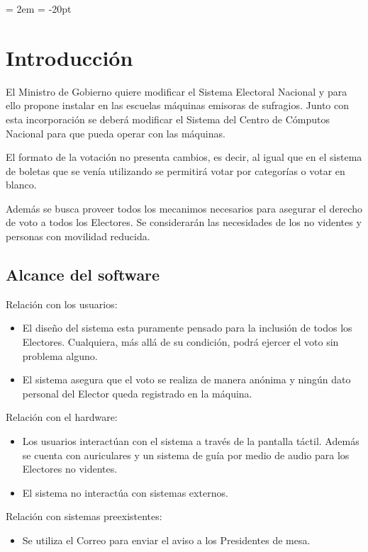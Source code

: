 \documentclass[spanish, 10pt,a4paper]{article}
\numberwithin{equation}{section} %
\begin{document}
{ \oddsidemargin = 2em
	\headheight = -20pt
	\maketitle
}
	\tableofcontents
	\newpage
\section{Introducción}
	El Ministro de Gobierno quiere modificar el Sistema Electoral Nacional y para ello propone instalar en las escuelas máquinas emisoras de sufragios. Junto con esta incorporación se deberá modificar el Sistema del Centro de Cómputos Nacional para que pueda operar con las máquinas.

	El formato de la votación no presenta cambios, es decir, al igual que en el sistema de boletas que se venía utilizando se permitirá votar por categorías o votar en blanco. 
	
	Además se busca proveer todos los mecanimos necesarios para asegurar el derecho de voto a todos los Electores. Se considerarán las necesidades de los no videntes y personas con movilidad reducida. 

\subsection{Alcance del software}

	Relación con los usuarios: 
\begin{itemize}
\item El diseño del sistema esta puramente pensado para la inclusión de todos los Electores. Cualquiera, más allá de su condición, podrá ejercer el voto sin problema alguno.
\item El sistema asegura que el voto se realiza de manera anónima y ningún dato personal del Elector queda registrado en la máquina.
\end{itemize}

	Relación con el hardware:
\begin{itemize}
\item Los usuarios interactúan con el sistema a través de la pantalla táctil. Además se cuenta con auriculares y un sistema de guía por medio de audio para los Electores no videntes.
\item El sistema no interactúa con sistemas externos.
\end{itemize}

	Relación con sistemas preexistentes:
\begin{itemize}	
\item Se utiliza el Correo para enviar el aviso a los Presidentes de mesa.
\end{itemize}
\end{document}

